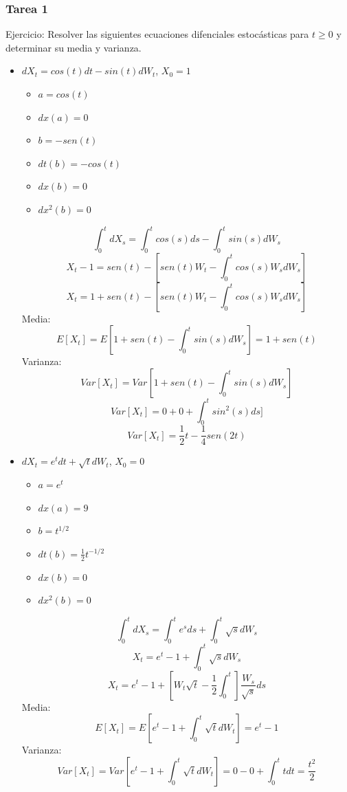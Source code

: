 \documentclass[11pt,fleqn]{book} %
\numberwithin{equation}{section} %
\numberwithin{figure}{section} %
\numberwithin{table}{section} %
\begin{document}
\subsubsection{Tarea 1}
Ejercicio: Resolver las siguientes ecuaciones difenciales estocásticas para $t \geq 0$ y determinar su media y varianza.
\begin{itemize}
    \item $dX_{t} = cos(t) dt - sin(t) dW_{t}$, $X_{0} = 1$
    \begin{itemize}
        \item $a = cos(t)$
        \item $dx (a) = 0 $
        \item $b = -sen(t) $
        \item $dt (b) = -cos(t)  $
        \item $dx (b) = 0$
        \item $dx^{2} (b) = 0$
    \end{itemize}
    $$ \int_{0}^{t} dX_{s} = \int_{0}^{t} cos(s) ds - \int_{0}^{t} sin(s) dW_{s}  $$
    $$ X_{t} - 1 = sen(t) - [sen(t) W_{t} -\int_{0}^{t} cos(s) W_{s} dW_{s}]$$
    $$ X_{t}  = 1 + sen(t) - [sen(t) W_{t} -\int_{0}^{t} cos(s) W_{s} dW_{s}]$$
    Media:
    $$ E[X_{t}] = E[ 1 + sen(t) - \int_{0}^{t} sin(s) dW_{s} ] = 1 + sen(t)  $$
    Varianza:
    $$ Var[X_{t}] =  Var[1 + sen(t) - \int_{0}^{t} sin(s) dW_{s}]$$
    $$ Var[X_{t}] =  0 + 0 + \int_{0}^{t} sin^{2}(s) ds]$$
    $$ Var[X_{t}] =  \frac{1}{2} t - \frac{1}{4} sen(2t)$$
    \item $dX_{t} = e^{t} dt + \sqrt{t} dW_{t}$, $X_{0} = 0$
    \begin{itemize}
        \item $a = e^{t} $
        \item $dx (a) = 9$
        \item $b = t^{1/2}$
        \item $dt (b) = \frac{1}{2} t^{-1/2} $
        \item $dx (b) = 0$
        \item $dx^{2} (b) = 0$
    \end{itemize}
    $$ \int_{0}^{t} dX_{s} = \int_{0}^{t} e^{s} ds + \int_{0}^{t} \sqrt{s} dW_{s}   $$
    $$ X_{t} = e^{t} - 1 + \int_{0}^{t} \sqrt{s} dW_{s}   $$
    $$ X_{t} = e^{t} - 1 + [W_{t} \sqrt{t} - \frac{1}{2} \int_{0}^{t} ]  \frac{W_{s}}{\sqrt{s}}ds $$
    Media:
    $$ E[X_{t}] = E[e^{t} - 1 + \int_{0}^{t} \sqrt{t} dW_{t}]  = e^{t} - 1  $$
    Varianza:
    $$  Var[X_{t}] = Var[e^{t} - 1 + \int_{0}^{t} \sqrt{t} dW_{t}] = 0 - 0 + \int_{0}^{t} t dt = \frac{t^{2}}{2}$$

\end{itemize}
\end{document}
